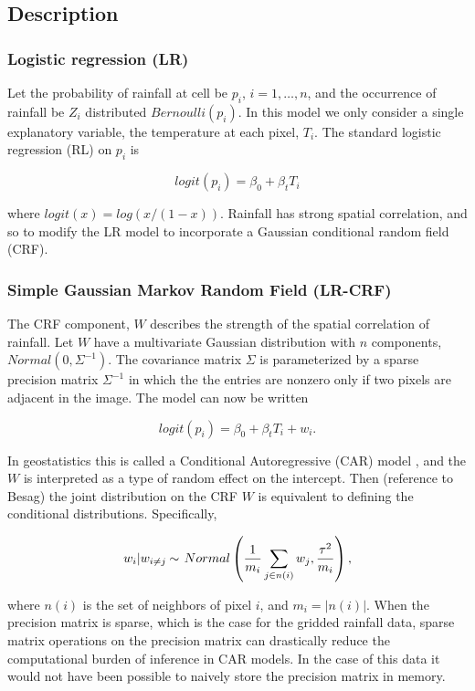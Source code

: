 \subsection{Description}

\subsubsection{Logistic regression (LR)}

Let the probability of rainfall at cell be $p_i$, $i=1,\ldots,n$, and the occurrence of rainfall be $Z_i$ distributed $Bernoulli(p_i)$. In this model we only consider a single explanatory variable, the temperature at each pixel, $T_i$. The standard logistic regression (RL) on $p_i$ is

$$
logit(p_i) = \beta_0 + \beta_t  T_i
$$

where $logit(x)=log(x/(1-x))$. Rainfall has strong spatial correlation, and so to modify the LR model to incorporate a Gaussian conditional random field (CRF). 

\subsubsection{Simple Gaussian Markov Random Field (LR-CRF)}

The CRF component, $W$ describes the strength of the spatial correlation of rainfall. Let $W$ have a multivariate Gaussian distribution with $n$ components, $Normal(0, \Sigma^{-1})$. The covariance matrix $\Sigma$ is parameterized by a sparse precision matrix $\Sigma^{-1}$ in which the the entries are nonzero only if two pixels are adjacent in the image. The model can now be written

$$
logit(p_i) = \beta_0 + \beta_t T_i + w_i.
$$

In geostatistics this is called a Conditional Autoregressive (CAR) model \cite{Waller2010}, and the $W$ is interpreted as a type of random effect on the intercept. Then (reference to Besag) the joint distribution on the CRF $W$ is equivalent to defining the conditional distributions. Specifically,

$$
w_i | w_{i \neq j} \distas{} \, Normal\left( \frac{1}{m_i} \sum_{j \in n(i)} w_j, \frac{\tau^2}{m_i} \right),
$$

where $n(i)$ is the set of neighbors of pixel $i$, and $m_i=|n(i)|$. When the precision matrix is sparse, which is the case for the gridded rainfall data, sparse matrix operations on the precision matrix can drastically reduce the computational burden of inference in CAR models. In the case of this data it would not have been possible to naively store the precision matrix in memory.

